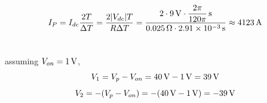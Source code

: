 \documentclass{article}
\newcommand{\unit}[1]{{\rm\,#1}}
\begin{document}
$$I_P=I_{dc}\frac{2T}{\Delta T}=\frac{2|V_{dc}|T}{R\Delta T}=\frac{2\cdot9\unit{V}\cdot\dfrac{2\pi}{120\pi}\unit{s}}{0.025\unit{\Omega}\cdot2.91\times10^{-3}\unit{s}}\approx4123\unit{A}$$


\section{}
assuming $V_{on}=1\unit{V}$,
$$V_1=V_p-V_{on}=40\unit{V}-1\unit{V}=39\unit{V}$$
$$V_2=-(V_p-V_{on})=-(40\unit{V}-1\unit{V})=-39\unit{V}$$
\end{document}
